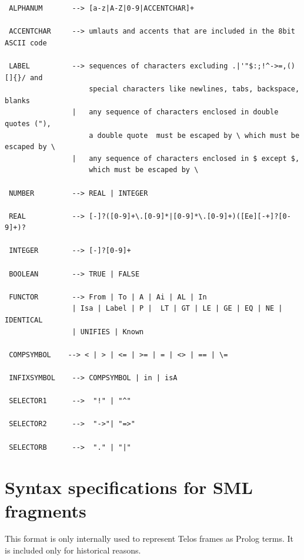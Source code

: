 {\small
\begin{verbatim}
 ALPHANUM       --> [a-z|A-Z|0-9|ACCENTCHAR]+

 ACCENTCHAR     --> umlauts and accents that are included in the 8bit ASCII code

 LABEL          --> sequences of characters excluding .|'"$:;!^->=,()[]{}/ and
                    special characters like newlines, tabs, backspace, blanks
                |   any sequence of characters enclosed in double quotes ("), 
                    a double quote  must be escaped by \ which must be escaped by \
                |   any sequence of characters enclosed in $ except $, 
                    which must be escaped by \

 NUMBER         --> REAL | INTEGER

 REAL           --> [-]?([0-9]+\.[0-9]*|[0-9]*\.[0-9]+)([Ee][-+]?[0-9]+)?

 INTEGER        --> [-]?[0-9]+

 BOOLEAN        --> TRUE | FALSE

 FUNCTOR        --> From | To | A | Ai | AL | In
                | Isa | Label | P |  LT | GT | LE | GE | EQ | NE | IDENTICAL
                | UNIFIES | Known

 COMPSYMBOL    --> < | > | <= | >= | = | <> | == | \= 
 
 INFIXSYMBOL    --> COMPSYMBOL | in | isA

 SELECTOR1      -->  "!" | "^"

 SELECTOR2      -->  "->"| "=>"

 SELECTORB      -->  "." | "|"
\end{verbatim}
}



\section{Syntax specifications for SML fragments}
\label{sec:fragments}

This format is only internally used to represent Telos frames as Prolog
terms. It is included only for historical reasons.

